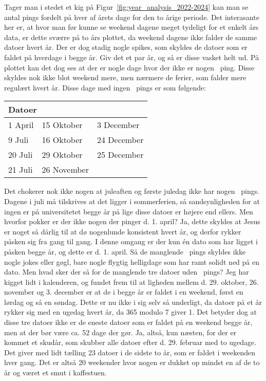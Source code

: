 \documentclass{article}
\newlength\myheight
\newlength\mydepth
\newcommand*\inlinegraphics[1]{%
  \settototalheight\myheight{Xygp}%
  \settodepth\mydepth{Xygp}%
  \raisebox{-\mydepth}{\texttt{[image: \#1]}}%
}
\newcommand{\coffee}[0]{\inlinegraphics{coffee.png}}
\begin{document}
Tager man i stedet et kig på Figur~\ref{fig:year_analysis_2022-2024} kan man se antal pings fordelt på hver af årets dage for den to årige periode. Det interasante her er, at hvor man før kunne se weekend dagene meget tydeligt for et enkelt års data, er dette sværre på to års plottet, da weekend dagene ikke falder de samme datoer hvert år. Der er dog stadig nogle spikes, som skyldes de datoer som er faldet på hverdage i begge år. Giv det et par år, og så er disse vasket helt ud.
På plottet kan det dog ses at der er nogle dage hvor der ikke er nogen \coffee\ ping. Disse skyldes nok ikke blot weekend mere, men nærmere de ferier, som falder mere regulært hvert år.
Disse dage med ingen \coffee\ pings er som følgende:
\begin{center}
	\begin{tabular}{l|l|l}
		\multicolumn{3}{l}{Datoer} \\ \hline
		\phantom{3}1 April & 15 Oktober & \phantom{3}3 December \\ 
		\phantom{3}9 Juli & 16 Oktober & 24 December \\ 
		20 Juli & 29 Oktober & 25 December \\
		21 Juli & 26 November & 
	\end{tabular}
\end{center}
Det chokerer nok ikke nogen at juleaften og første juledag ikke har nogen \coffee\ pings.
Dagene i juli må tilskrives at det ligger i sommerferien, så sandsynligheden for at ingen er på universitetet begge år på lige disse datoer er højere end ellers.
Men hvorfor pokker er der ikke nogen der pinger d. 1. april? Ja, dette skyldes at Jesus er noget så dårlig til at dø nogenlunde konsistent hvert år, og derfor rykker påsken sig fra gang til gang. I denne omgang er der kun én dato som har ligget i påsken begge år, og dette er d. 1. april. Så de manglende \coffee\ pings skyldes ikke nogle jokes eller gøgl, bare nogle flygtig helligdage som har ramt solidt ned på en dato.
Men hvad sker der så for de manglende tre datoer uden \coffee\ pings?
Jeg har kigget lidt i kalenderen, og fundet frem til at ligheden mellem d. 29. oktober, 26. november og 3. december er at de i begge år er faldet i en weekend, først en lørdag og så en søndag. Dette er nu ikke i sig selv så underligt, da datoer på et år rykker sig med en ugedag hvert år, da 365 modulo 7 giver 1. Det betyder dog at disse tre datoer ikke er de eneste datoer som er faldet på en weekend begge år, men at der bør være ca. 52 dage der gør. Ja, altså, kun næsten, for der er kommet et skudår, som skubber alle datoer efter d. 29. februar med to ugedage. Det giver med lidt tælling 23 datoer i de sidste to år, som er faldet i weekenden hver gang. Det er altså 20 weekender hvor nogen er dukket op mindst en af de to år og været et smut i kaffestuen.
\end{document}
